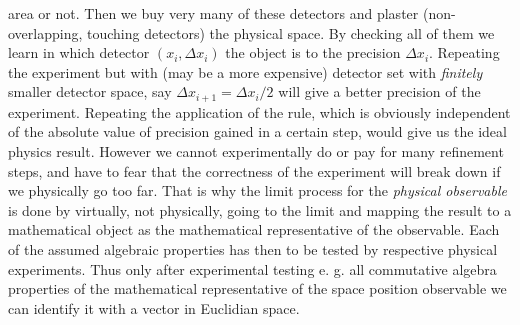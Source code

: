 area or not.  Then we buy very many of these detectors and plaster (non-overlapping,
touching detectors) the physical space.  By checking all of them we learn in which
detector $(x_i ,\Delta x_i) $ the object is to the precision $\Delta x_i$. Repeating the
experiment but with (may be a more expensive) detector set with {\emph{finitely}} smaller
detector space, say $\Delta x_{i+1} = \Delta x_i/2$ will give a better precision of the
experiment. Repeating the application of the rule, which is obviously independent of the
absolute value of precision gained in a certain step, would give us the ideal physics
result. However we cannot experimentally do or pay for many refinement steps, and have to
fear that the correctness of the experiment will break down if we physically go too far.
That is why the limit process for the {\emph{physical observable}} is done by virtually,
not physically, going to the limit and mapping the result to a mathematical object as the
mathematical representative of the observable.  Each of the assumed algebraic properties
has then to be tested by respective physical experiments. Thus only after experimental
testing e. g. all commutative algebra properties of the mathematical representative of the
space position observable we can identify it with a vector in Euclidian space.
 
